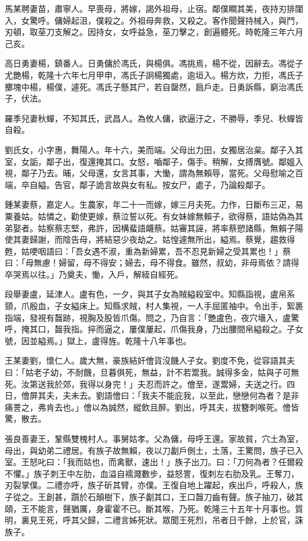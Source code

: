 \begin{pinyinscope}
馬某聘妻苗，肅寧人。早喪母，將嫁，謁外祖母，止宿。鄰僕瞷其美，夜持刃排闥入，女驚呼。傭婦起沮，僕殺之。外祖母奔救，又殺之。客作聞聲持械入，與鬥，刃頓，取莝刀支解之。因持女，女呼益急，莝刀擊之，創遍體死。時乾隆三年六月己亥。

高日勇妻楊，鎮番人。日勇傭於馮氏，與楊俱。馮挑焉，楊不從，因辭去。馮從子尤艷楊，乾隆十六年七月甲申，馮氏子詗楊獨處，逾垣入。楊方炊，力拒，馮氏子擲塊中楊，楊僕，遽死。馮氏子懸其尸，若自罄然，扃戶走。日勇訴縣，窮治馮氏子，伏法。

羅季兒妻秋蟬，不知其氏，武昌人。為攸人傭，欲逼汙之，不勝辱，季兒、秋蟬皆自殺。

劉氏女，小字惠，舞陽人。年十六，美而端。父母出力田，女獨居治枲。鄰子入其室，女詬，鄰子出，復還掩其口。女怒，嚙鄰子，傷手。稍解，女搏膺號。鄰媼入視，鄰子乃去。晡，父母還，女言其事，大慟，謂為無賴辱，當死。父母慰喻之百端，卒自縊。告官，鄰子詭言故與女有私。按女尸，處子，乃論殺鄰子。

鍾某妻蔡，嘉定人。生農家，年二十一而嫁，嫁三月夫死。力作，日斷布三疋，易粟養姑。姑憐之，勸使更嫁，蔡泣誓以死。有女妹嫁無賴子，欲得蔡，語姑偽為其弟娶者。姑察蔡志堅，弗許，因構蜚語衊蔡。姑審其誣，將率蔡愬諸縣，無賴子陽使其妻歸謝，而陰告母，將結惡少夜劫之。姑惶遽無所出，縊焉。蔡覺，趨救得甦，姑哽咽語曰：「吾女遇不淑，重為新婦累，吾不忍見新婦之受其累也！」蔡曰：「母無慮！婦留，母不得安；婦去，母不得食。雖然，叔幼，非母焉依？請得卒哭焉以往。」乃奠夫，慟，入戶，解絰自經死。

段舉妻盧，延津人。盧有色，一夕，與其子女為賊縊殺室中。知縣詣視，盧帛系頸，爪殷血，子女縊床上。知縣求賊，村人集視，一人手屈匿袖中。令出手，絮裹指端，發視有齧跡，視胸及股皆爪傷。問之，乃自言：「艷盧色，夜穴墻入，盧驚呼，掩其口，齧我指。捽而逼之，屢僕屢起，爪傷我身，乃出腰間帛縊殺之。子女號，因並縊焉。」獄上，盧得旌。乾隆十八年事也。

王某妻劉，懷仁人。歲大無，豪族結奸儈貨沒饑人子女。劉度不免，從容語其夫曰：「姑老子幼，不耐饑，旦暮俱死，無益，計不若鬻我。誠得多金，姑與子可無死。汝第送我於郊，我得以身完！」夫忍而許之。儈至，遂鬻婦，夫送之行。四日，儈屏其夫，夫未去。劉語儈曰：「我夫不能庇我，以至此，戀戀何為者？是非痛詈之，弗肯去也。」儈以為誠然，縱飲且醉。劉出，呼其夫，拔簪刺喉死。儈皆驚，散去。

張良善妻王，鞏縣雙槐村人。事舅姑孝。父為傭，母呼王還。家故貧，穴土為室，母出，與幼弟二禮居。有族子故無賴，夜以刀劙戶側土，土落，王驚問，族子已入室。王怒叱曰：「我而姑也，而禽獸，速出！」族子出刀。曰：「刀何為者？任爾殺不懼。」族子刺王中左肋，血溢自襦濺數步，益怒詈，復刺左右肋及乳。王奪刀，刃裂掌僕。二禮亦呼，族子斫其臂，亦僕。王復自地上躍起，疾出戶，呼殺人，族子從之。王創甚，躓於石顛樹下，族子劙其口，王口齧刀齒有聲。族子抽刀，破其頤，王不能言，聲猶厲，身霍霍不已。斷其喉，乃死。乾隆三十五年十月事也。質明，裏見王死，呼其父歸，二禮言姊死狀。眾聞王死烈，吊者日千餘，上於官，誅族子。


\end{pinyinscope}
